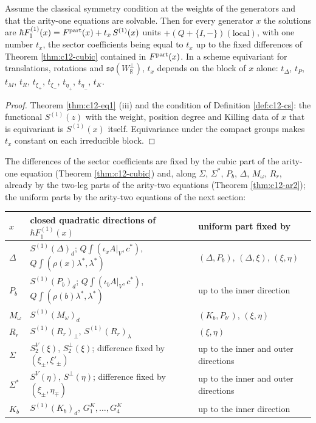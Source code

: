 \begin{theorem}
\label{thm:c12-H}
Assume the classical symmetry condition at the weights of the generators and that the arity-one equations are solvable. Then for every generator $x$ the solutions are $\hbar F_1^{(1)}(x)=F^{\rm part}(x)+t_x\,S^{(1)}(x)$ units $+(Q+\{I,-\})(\text{local})$, with one number $t_x$, the sector coefficients being equal to $t_x$ up to the fixed differences of Theorem \ref{thm:c12-cubic} contained in $F^{\rm part}(x)$. In a scheme equivariant for translations, rotations and $\mathfrak{so}(W_{\mathbb R}^\perp)$, $t_x$ depends on the block of $x$ alone: $t_\Delta$, $t_P$, $t_M$, $t_R$, $t_{\xi_+}$, $t_{\xi_-}$, $t_{\eta_+}$, $t_{\eta_-}$, $t_K$.
\end{theorem}

\begin{proof}
Theorem \ref{thm:c12-eq1} (iii) and the condition of Definition \ref{def:c12-cs}: the functional $S^{(1)}(z)$ with the weight, position degree and Killing data of $x$ that is equivariant is $S^{(1)}(x)$ itself. Equivariance under the compact groups makes $t_x$ constant on each irreducible block.
\end{proof}

\begin{remark}
\label{rem:c12-freetable}
The differences of the sector coefficients are fixed by the cubic part of the arity-one equation (Theorem \ref{thm:c12-cubic}) and, along $\Sigma$, $\Sigma^*$, $P_b$, $\Delta$, $M_\omega$, $R_r$, already by the two-leg parts of the arity-two equations (Theorem \ref{thm:c12-ar2}); the uniform parts by the arity-two equations of the next section:

\begin{tabular}{l|l|l}
$x$ & closed quadratic directions of $\hbar F_1^{(1)}(x)$ & uniform part fixed by\\
\hline
$\Delta$ & $S^{(1)}(\Delta)_d$; $Q\int(\iota_xA|_V,c^*)$, $Q\int(\rho(x)\lambda^*,\lambda^*)$ & $(\Delta,P_b)$, $(\Delta,\xi)$, $(\xi,\eta)$\\
$P_b$ & $S^{(1)}(P_b)_d$; $Q\int(\iota_bA|_V,c^*)$, $Q\int(\rho(b)\lambda^*,\lambda^*)$ & up to the inner direction\\
$M_\omega$ & $S^{(1)}(M_\omega)_d$ & $(K_b,P_{b'})$, $(\xi,\eta)$\\
$R_r$ & $S^{(1)}(R_r)_\perp$, $S^{(1)}(R_r)_\lambda$ & $(\xi,\eta)$\\
$\Sigma$ & $S^V_2(\xi)$, $S^\perp_2(\xi)$; difference fixed by $(\xi_\pm,\xi'_\pm)$ & up to the inner and outer directions\\
$\Sigma^*$ & $S^V(\eta)$, $S^\perp(\eta)$; difference fixed by $(\xi_\pm,\eta_\mp)$ & up to the inner and outer directions\\
$K_b$ & $S^{(1)}(K_b)_d$, $G^K_1,\dots,G^K_4$ & up to the inner direction\\
\end{tabular}
\end{remark}

